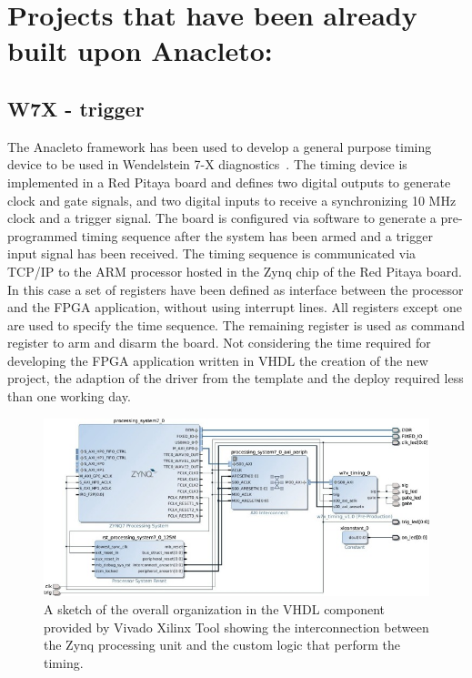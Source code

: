 \section{Projects that have been already built upon Anacleto:}
\subsection{W7X - trigger }
\label{section:W7X}
The Anacleto framework has been used to develop a general purpose timing device to be used in Wendelstein 7-X diagnostics~\cite{RIGONI2018122}. The timing device is implemented in a Red Pitaya board and defines two digital outputs to generate clock and gate signals, and two digital inputs to receive a synchronizing 10 MHz clock and a trigger signal. The board is configured via software to generate a pre-programmed timing sequence after the system has been armed and a trigger input signal has been received. The timing sequence is communicated via TCP/IP to the ARM processor hosted in the Zynq chip of the Red Pitaya board. In this case a set of registers have been defined as interface between the processor and the FPGA application, without using interrupt lines. All registers except one are used to specify the time sequence. The remaining register is used as command register to arm and disarm the board. Not considering the time required for developing the FPGA application written in VHDL the creation of the new project, the adaption of the driver from the template and the deploy required less than one working day.

\begin{figure}
    \centering
    \includegraphics{img/APPENDIX/W7X_VHDL.jpg}
    \caption{A sketch of the overall organization in the VHDL component provided by Vivado Xilinx Tool showing the interconnection between the Zynq processing unit and the custom logic that perform the timing. }
    \label{fig:W7X}
\end{figure}


